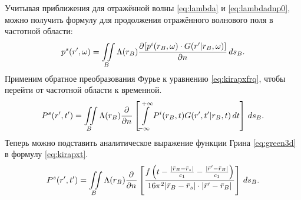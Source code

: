 \documentclass[a4paper, fontsize=14pt]{article}
\begin{document}
	Учитывая приближения для отражённой волны \ref{eq:lambda} и \ref{eq:lambdadnp0}, можно получить формулу для продолжения отражённого волнового поля в частотной области:
	\begin{equation}
		p^s(r',\omega)= \iint\limits_B \Lambda(r_B) \frac{\partial ^ {  } [p^i(r_B,\omega)\cdot G(r'|r_B,\omega)]}{\partial n ^ {  } } \,ds_B.
		\label{eq:kirapxfrq}
	\end{equation}
	Применим обратное преобразования Фурье к уравнению \ref{eq:kirapxfrq}, чтобы перейти от частотной области к временной.
	\begin{equation}
			P^s(r',t')= \iint\limits_B \Lambda(r_B) \frac{\partial ^ {  } }{\partial n ^ {  } } \left[\int\limits_{-\infty}^{+\infty}P^i(r_B,t)G(r',t'|r_B,t)\,dt\right]\,ds_B.
			\label{eq:kirapxt}
	\end{equation} 
	Теперь можно подставить аналитическое выражение функции Грина \ref{eq:green3d} в формулу \ref{eq:kirapxt}.\cite{fomel}
	\begin{equation}
		P^s(r',t')= \iint\limits_B \Lambda(r_B) \frac{\partial ^ {  } }{\partial n ^ {  } } \left[\frac{f\left(t - \frac{|\bar{r}_B-\bar{r}_s|}{c_1} -\frac{|\bar{r}'-\bar{r}_B|}{c_1} \right)}{16\pi^2|\bar{r}_B-\bar{r}_s|\cdot |\bar{r}'-\bar{r}_B|}\right]\,ds_B.
		\label{eq:kirapxgt}
	\end{equation} 
\end{document}
